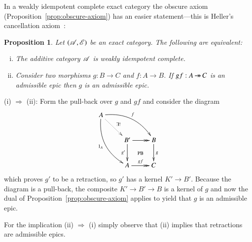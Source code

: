 \documentclass[1p]{elsarticle}
\makeatletter
\renewenvironment{proof}[1][\proofname]{\par
  \pushQED{\qed}%
  \normalfont \topsep6\p@\@plus6\p@\relax
  \trivlist
  \item[\hskip\labelsep
        \scshape
    #1\@addpunct{.}]\ignorespaces
}{%
  \popQED\endtrivlist\@endpefalse
}
\theoremstyle{mythm}
\newtheorem{Prop}[Thm]{Proposition}
\theoremstyle{mydef}
\makeatother
\begin{document}
In a weakly idempotent complete exact category the obscure axiom
(Proposition~\ref{prop:obscure-axiom}) has an easier statement---this
is Heller's cancellation axiom~\cite[(P2), p.~492]{MR0100622}:

\begin{Prop}
  \label{prop:weakly-split-obscure-axiom}
  Let $(\operatorname{\mathscr{A}},\operatorname{\mathscr{E}})$ be an exact category. The following are
  equivalent:
  \begin{enumerate}[(i)]
    \item
      The additive category $\operatorname{\mathscr{A}}$ is weakly idempotent complete.
    \item
      Consider two morphisms $g: B \to C$ and $f: A \to B$.
      If $gf: A \operatorname{\twoheadrightarrow} C$ is an admissible
      epic then $g$ is an admissible epic.
  \end{enumerate}
\end{Prop}
\begin{proof}
  (i) $\Rightarrow$ (ii):
  Form the pull-back over $g$ and $gf$ and consider the diagram 
  \[ 
  \xymatrix{
    A  \ar@/_1.2pc/[ddr]_-{1_{A}} \ar@/^1.2pc/[drr]^-{f} 
    \ar@{.>}[dr]^{\exists!} \\
    & B' \ar@{->>}[r] \ar[d]_-{g'}
    \ar@{}[dr]|{\text{PB}} & B \ar[d]^{g}
    \\
    & A \ar@{->>}[r]^{gf} & C   
  }
  \]
  which proves $g'$ to be a retraction, so
  $g'$ has a kernel $K' \to B'$. Because the diagram is a pull-back, the
  composite $K' \to B' \to B$ is a kernel of $g$ and now the dual of
  Proposition~\ref{prop:obscure-axiom} applies to yield that
  $g$ is an admissible epic.
  
  For the implication (ii) $\Rightarrow$ (i) simply observe that (ii)
  implies that retractions are admissible epics.
\end{proof}
\end{document}
